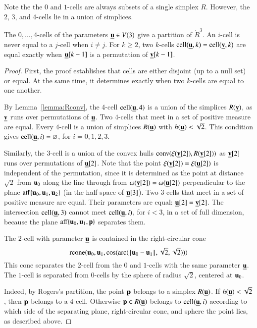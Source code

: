 Note the the $0$ and $1$-cells are always subsets of a single simplex $R$.  However, the $2$, $3$, and
$4$-cells lie in a union of  simplices.

\begin{lemma}  The $0,\ldots,4$-cells of the parameters ${\underline{{\mathbf u}}}\in  V(3)$
give a partition of $\ring{R}^3$.  An $i$-cell is never equal to a $j$-cell when $i\ne j$. For $k\ge 2$, 
two $k$-cells $\operatorname{cell}({\underline{{\mathbf u}}},k)=\operatorname{cell}({\underline{{\mathbf v}}},k)$ are equal exactly when ${\underline{{\mathbf u}}}[k-1]$
is a permutation of ${\underline{{\mathbf v}}}[k-1]$.
\end{lemma}

\begin{proof}  First, the proof establishes that cells are either disjoint (up to a null set) or equal.  At the same time, it determines exactly when two $k$-cells are equal to one another. 

By Lemma~\ref{lemma:Rconv}, the $4$-cell $\operatorname{cell}({\underline{{\mathbf u}}},4)$ is a union of the simplices $R({\underline{{\mathbf v}}})$, as ${\underline{{\mathbf v}}}$ runs over permutations of ${\underline{{\mathbf u}}}$.   Two $4$-cells that meet in a set of positive measure are equal.  Every $4$-cell is a union of simplices $R({\underline{{\mathbf u}}})$ with $h({\underline{{\mathbf u}}})<\sqrt2$.  This condition gives $\operatorname{cell}({\underline{{\mathbf u}}},i)=\varnothing$, for $i=0,1,2,3$.

Similarly, the $3$-cell is a union
of the convex hulls ${\operatorname{conv}}(\xi({\underline{{\mathbf v}}}[2]),R({\underline{{\mathbf v}}}[2]))$ as ${\underline{{\mathbf v}}}[2]$ runs over permutations of ${\underline{{\mathbf u}}}[2]$.  Note that the point $\xi({\underline{{\mathbf v}}}[2])=\xi({\underline{{\mathbf u}}}[2])$ is independent of the permutation, since
it is determined as the point at distance $\sqrt2$ from $ {\mathbf u}_0$ along the line through
from $\omega({\underline{{\mathbf v}}}[2])=\omega({\underline{{\mathbf u}}}[2])$ perpendicular to the plane ${\operatorname{aff}}\{ {\mathbf u}_0, {\mathbf u}_1, {\mathbf u}_2\}$
(in the half-space of ${\underline{{\mathbf u}}}[3]$). Two $3$-cells that meet in a set of positive measure are equal.  Their parameters are equal: ${\underline{{\mathbf u}}}[2]={\underline{{\mathbf v}}}[2]$.    The intersection $\operatorname{cell}({\underline{{\mathbf u}}},3)$ cannot meet $\operatorname{cell}({\underline{{\mathbf u}}},i)$, for $i<3$, in a set of full dimension, because the plane ${\operatorname{aff}}\{ {\mathbf u}_0, {\mathbf u}_1,{\mathbf p}\}$ separates them.

The $2$-cell with parameter ${\underline{{\mathbf u}}}$ is contained in the right-circular cone
$$
{\operatorname{rcone}}( {\mathbf u}_0, {\mathbf u}_1,\cos({\operatorname{arc}}({\hskip0.1em|\hskip-0.15em|\hskip0.1em} {\mathbf u}_0 -  {\mathbf u}_1{\hskip0.1em|\hskip-0.15em|\hskip0.1em},\sqrt2,\sqrt2)))
$$
This cone separates the $2$-cell from the $0$ and $1$-cells with the same parameter ${\underline{{\mathbf u}}}$.
The $1$-cell is separated from $0$-cells by the sphere
of radius $\sqrt2$, centered at $ {\mathbf u}_0$.

  Indeed, by Rogers's
partition, the point ${\mathbf p}$ belongs to a  simplex $R({\underline{{\mathbf u}}})$.  If $h({\underline{{\mathbf u}}})<\sqrt2$, then
${\mathbf p}$ belongs to a $4$-cell.  Otherwise ${\mathbf p}\in R({\underline{{\mathbf u}}})$ belongs to $\operatorname{cell}({\underline{{\mathbf u}}},i)$ according to
which side of the separating plane, right-circular cone, and sphere  the point
lies, as described above.
\end{proof}


